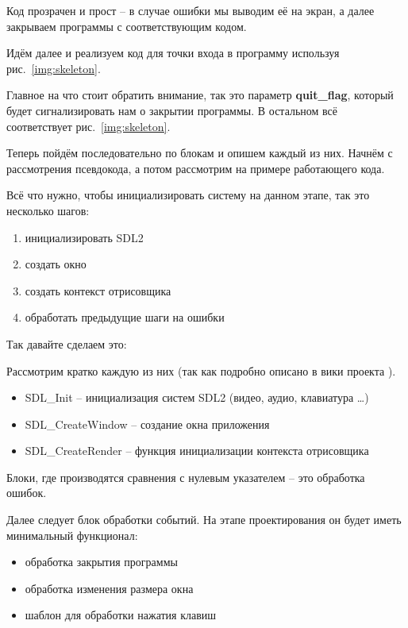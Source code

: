 Код прозрачен и прост -- в случае ошибки мы выводим её на экран, а далее закрываем программы с 
соответствующим кодом. 

Идём далее и реализуем код для точки входа в программу используя рис.~\ref{img:skeleton}.


Главное на что стоит обратить внимание, так это параметр \textbf{quit\_flag}, который будет сигнализировать 
нам о закрытии программы. В остальном всё соответствует рис.~\ref{img:skeleton}.

Теперь пойдём последовательно по блокам и опишем каждый из них. Начнём с рассмотрения псевдокода, а потом 
рассмотрим на примере работающего кода.

Всё что нужно, чтобы инициализировать систему на данном этапе, так это несколько шагов:
\begin{enumerate}
    \item инициализировать SDL2
    \item создать окно
    \item создать контекст отрисовщика
    \item обработать предыдущие шаги на ошибки
\end{enumerate}

Так давайте сделаем это:



Рассмотрим кратко каждую из них (так как подробно описано в вики проекта \cite{sdl2wiki}).

\begin{itemize}
    \item SDL\_Init -- инициализация систем SDL2 (видео, аудио, клавиатура \ldots)
    \item SDL\_CreateWindow -- создание окна приложения
    \item SDL\_CreateRender -- функция инициализации контекста отрисовщика
\end{itemize}

Блоки, где производятся сравнения с нулевым указателем -- это обработка ошибок.

Далее следует блок обработки событий. На этапе проектирования он будет иметь минимальный функционал:
\begin{itemize}
    \item обработка закрытия программы
    \item обработка изменения размера окна
    \item шаблон для обработки нажатия клавиш
\end{itemize}


